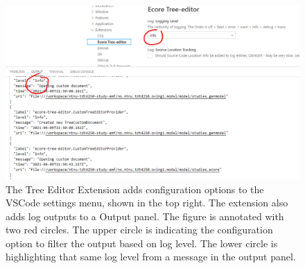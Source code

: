 \begin{figure}[htbp]  %
  \centering
  \includegraphics[width=\textwidth]{figures/gitpod-vscode-config-and-logging.png}
  \caption[Tree Editor Extension with configuration and logging]{The Tree Editor Extension adds configuration options to the \gls{VSCode} settings menu, shown in the top right.
  The extension also adds log outputs to a Output panel.
  The figure is annotated with two red circles.
  The upper circle is indicating the configuration option to filter the output based on log level.
  The lower circle is highlighting that same log level from a message in the output panel.}\label{fig:gitpod-ext-config-log}
\end{figure}

\FloatBarrier %
